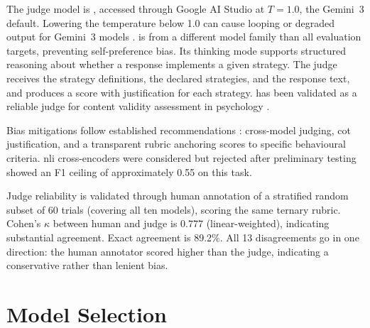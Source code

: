 The judge model is , accessed through Google AI
Studio at $T = 1.0$, the Gemini~3 default. Lowering the temperature below
1.0 can cause looping or degraded output for Gemini~3 models
\parencite{W2RFM6E4}.  is from a different model family
than all evaluation targets, preventing self-preference bias. Its thinking
mode supports structured reasoning about whether a response implements a
given strategy. The judge receives the strategy definitions, the declared
strategies, and the response text, and produces a score with justification
for each strategy.  has been validated as a
reliable judge for content validity assessment in psychology
\parencite{XQDRY83T}.

Bias mitigations follow established recommendations
\parencite{LVLA9LZU}: cross-model judging, \gls{cot} justification, and
a transparent rubric anchoring scores to specific behavioural criteria.
\gls{nli} cross-encoders were considered but rejected after preliminary
testing showed an F1 ceiling of approximately 0.55 on this task.

Judge reliability is validated through human annotation of a stratified
random subset of 60 trials (covering all ten models), scoring the same
ternary rubric. Cohen's $\kappa$ between human and judge is $0.777$
(linear-weighted), indicating substantial agreement. Exact agreement is
89.2\%. All 13 disagreements go in one direction: the human annotator
scored higher than the judge, indicating a conservative rather than
lenient bias.




\section{Model Selection}
\label{sec:meth-models}
%
%

